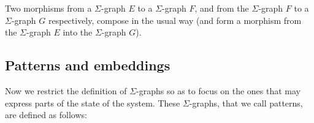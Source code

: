 \documentclass{entcs}
\newcommand{\keep}[3]{#1{#2}{#3}}
\begin{document}
Two morphisms from a $\Sigma$-graph  $E$ to a $\Sigma$-graph $F$, and from the $\Sigma$-graph $F$ to a $\Sigma$-graph $G$ respectively, compose in the usual way (and form a morphism from the $\Sigma$-graph $E$ into the
$\Sigma$-graph  $G$).

\subsection{Patterns and embeddings}

Now we restrict the definition of $\Sigma$-graphs so as to
focus on the ones that may express parts of the state of the system.
These $\Sigma$-graphs, that we call patterns, are defined as follows:

%
%
\end{document}

